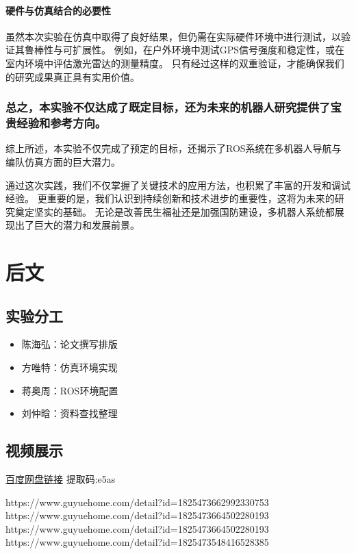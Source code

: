 \documentclass[journal,twoside,web]{ieeecolor}
\begin{document}
\paragraph{硬件与仿真结合的必要性}
虽然本次实验在仿真中取得了良好结果，但仍需在实际硬件环境中进行测试，以验证其鲁棒性与可扩展性。
例如，在户外环境中测试GPS信号强度和稳定性，或在室内环境中评估激光雷达的测量精度。
只有经过这样的双重验证，才能确保我们的研究成果真正具有实用价值。
 
\subsubsection*{总之，本实验不仅达成了既定目标，还为未来的机器人研究提供了宝贵经验和参考方向。}
综上所述，本实验不仅完成了预定的目标，还揭示了ROS系统在多机器人导航与编队仿真方面的巨大潜力。

通过这次实践，我们不仅掌握了关键技术的应用方法，也积累了丰富的开发和调试经验。
更重要的是，我们认识到持续创新和技术进步的重要性，这将为未来的研究奠定坚实的基础。
无论是改善民生福祉还是加强国防建设，多机器人系统都展现出了巨大的潜力和发展前景。

\section{后文}
\subsection{实验分工}
\begin{itemize}
    \item 陈海弘：论文撰写排版
    \item 方唯特：仿真环境实现
    \item 蒋奥周：ROS环境配置
    \item 刘仲晗：资料查找整理
\end{itemize}

\subsection{视频展示}
\href{https://pan.baidu.com/s/1YnxgZXi0YKYByZcN-seqfw?pwd=e5as}{百度网盘链接}
提取码:e5as
\begin{thebibliography}{00}
     https://www.guyuehome.com/detail?id=1825473662992330753
     https://www.guyuehome.com/detail?id=1825473664502280193
     https://www.guyuehome.com/detail?id=1825473664502280193
     https://www.guyuehome.com/detail?id=1825473548416528385
\end{thebibliography}
\end{document}
